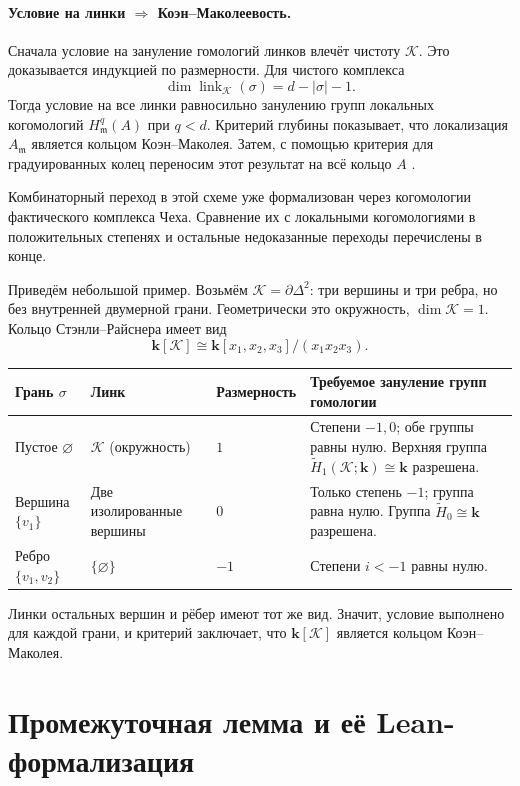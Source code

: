 \documentclass[11pt]{amsart}
\begin{document}
\paragraph{\textbf{Условие на линки $\Rightarrow$  Коэн--Маколеевость.}}
Сначала условие на зануление гомологий линков влечёт чистоту $\mathcal{K}$. Это доказывается
индукцией по размерности. Для чистого комплекса
\[
  \dim\operatorname{link}_{\mathcal{K}}(\sigma)=d-|\sigma|-1.
\]
Тогда условие на все линки равносильно занулению групп локальных когомологий
$H^q_{\mathfrak m}(A)$ при $q<d$. Критерий глубины показывает, что
локализация $A_{\mathfrak m}$ является кольцом Коэн--Маколея. Затем, с помощью критерия
для градуированных колец переносим этот результат на всё кольцо $A$
\cite[Item~2.1.27]{BrunsHerzog}.

Комбинаторный переход в этой схеме уже формализован через когомологии
фактического комплекса Чеха. Сравнение их с локальными когомологиями в
положительных степенях и остальные недоказанные переходы перечислены в конце.

Приведём небольшой пример. Возьмём $\mathcal{K}=\partial\Delta^2$: три вершины и три ребра, но без внутренней
двумерной грани. Геометрически это окружность, $\dim\mathcal{K}=1$. Кольцо
Стэнли--Райснера имеет вид
\[
  \mathbf{k}[\mathcal{K}]\cong
  \mathbf{k}[x_1,x_2,x_3]/(x_1x_2x_3).
\]
\begin{center}
\small
\begin{tabularx}{\textwidth}{@{}p{2cm}p{3.5cm}p{2.6cm}X@{}}
\toprule
\textbf{Грань $\sigma$} & \textbf{Линк} & \textbf{Размерность} &
\textbf{Требуемое зануление групп гомологии} \\
\midrule
Пустое $\varnothing$ & $\mathcal{K}$ (окружность) & $1$ &
Степени $-1,0$; обе группы равны нулю. Верхняя группа
$\widetilde H_1(\mathcal{K};\mathbf{k})\cong\mathbf{k}$ разрешена. \\
Вершина $\{v_1\}$ & Две изолированные вершины & $0$ &
Только степень $-1$; группа равна нулю. Группа
$\widetilde H_0\cong\mathbf{k}$ разрешена. \\
Ребро $\{v_1,v_2\}$ & $\{\varnothing\}$ & $-1$ &
Степени $i<-1$ равны нулю. \\
\bottomrule
\end{tabularx}
\end{center}
Линки остальных вершин и рёбер имеют тот же вид. Значит, условие выполнено
для каждой грани, и критерий заключает, что $\mathbf{k}[\mathcal{K}]$ является
кольцом Коэн--Маколея.

\section{Промежуточная лемма и её Lean-формализация}
\end{document}
